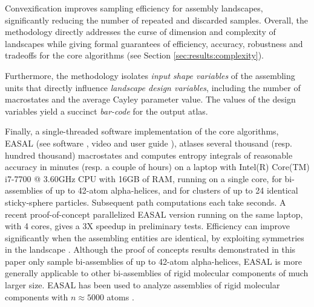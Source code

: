 \documentclass[]{article}
\begin{document}
Convexification improves sampling efficiency for assembly landscapes,
significantly reducing the number of repeated and discarded samples. Overall,
the methodology directly addresses the curse of dimension and complexity of
landscapes while giving formal guarantees of efficiency, accuracy, robustness
and tradeoffs for the core algorithms (see Section
\ref{sec:results:complexity}). 

Furthermore, the methodology isolates \emph{input shape variables} of the
assembling units that directly influence \emph{landscape design variables},
including the number of macrostates and the average Cayley parameter value.
The values of the design variables yield a succinct \emph{bar-code} for the
output atlas.

Finally, a single-threaded software implementation of the core algorithms,
EASAL \cite{Ozkan:toms} (see software \cite{easalSoftware}, video
\cite{easalVideo} and user guide \cite{easalUserGuide}), atlases several
thousand (resp. hundred thousand) macrostates and computes entropy integrals of
reasonable accuracy in minutes (resp. a couple of hours) on a laptop with
Intel(R) Core(TM) i7-7700 @ 3.60GHz CPU with 16GB of RAM, running on a single
core, for bi-assemblies of up to 42-atom alpha-helices, and for clusters of up
to 24 identical sticky-sphere particles. Subsequent path computations each take
seconds. A recent proof-of-concept parallelized EASAL version running on the
same laptop, with 4 cores, gives a 3X speedup in preliminary tests. Efficiency
can improve significantly when the assembling entities are identical, by
exploiting symmetries in the landscape \cite{sym8010005}. Although the proof of
concepts results demonstrated in this paper only sample bi-assemblies of up to
42-atom alpha-helices, EASAL is more generally applicable to other
bi-assemblies of rigid molecular components of much larger size. EASAL has been
used to analyze assemblies of rigid molecular components with $n \approx 5000$
atoms \cite{Wu2012,virus2019}.
\end{document}
